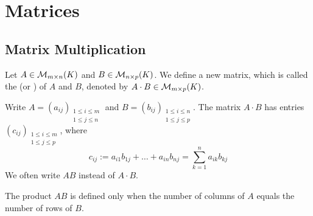 \renewcommand{\thetheorem}{\arabic{chapter}.\alph{section}.\arabic{theorem}}
\setcounter{chapter}{14} %

\setcounter{chapter}{16}
\chapter{Matrices}

\section{Matrix Multiplication}

\begin{definition}
Let $A \in \mathcal{M}_{m \times n}(K)$ and $B \in \mathcal{M}_{n \times p}(K)$. We define a new matrix, which is called the  (or ) of $A$ and $B$, denoted by $A \cdot B \in \mathcal{M}_{m \times p}(K)$.

Write $A = (a_{ij})_{\substack{1 \le i \le m \\ 1 \le j \le n}}$ and $B = (b_{ij})_{\substack{1 \le i \le n \\ 1 \le j \le p}}$. The matrix $A \cdot B$ has entries $(c_{ij})_{\substack{1 \le i \le m \\ 1 \le j \le p}}$, where
\begin{equation*}
    c_{ij} := a_{i1}b_{1j} + \dots + a_{in}b_{nj} = \sum_{k=1}^{n} a_{ik}b_{kj}
\end{equation*}
We often write $AB$ instead of $A \cdot B$. 
\end{definition}

\begin{importantremark}
The product $AB$ is defined only when the number of columns of $A$ equals the number of rows of $B$.
\end{importantremark}

